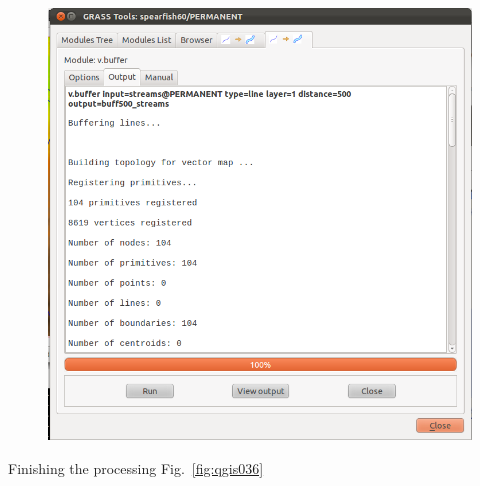 \begin{figure}[htbp]
   \centering
   \includegraphics[scale=0.3]{qgis035.png}
   \caption{}
   \label{fig:qgis035}
\end{figure}

Finishing the processing Fig.~\ref{fig:qgis036}

